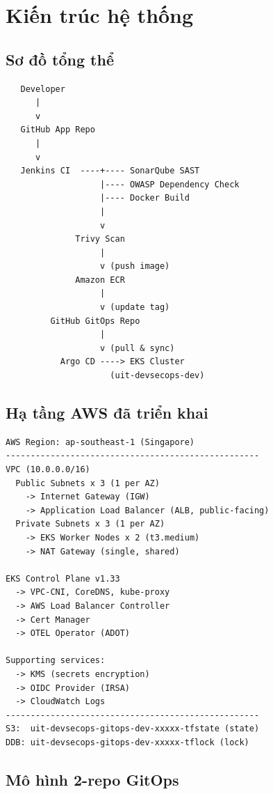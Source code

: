 \documentclass[12pt,a4paper]{article}
\begin{document}
\section{Kiến trúc hệ thống}

\subsection{Sơ đồ tổng thể}

\begin{verbatim}
   Developer
      |
      v
   GitHub App Repo
      |
      v
   Jenkins CI  ----+---- SonarQube SAST
                   |---- OWASP Dependency Check
                   |---- Docker Build
                   |
                   v
              Trivy Scan
                   |
                   v (push image)
              Amazon ECR
                   |
                   v (update tag)
         GitHub GitOps Repo
                   |
                   v (pull & sync)
           Argo CD ----> EKS Cluster
                     (uit-devsecops-dev)
\end{verbatim}

\subsection{Hạ tầng AWS đã triển khai}

\begin{verbatim}
AWS Region: ap-southeast-1 (Singapore)
---------------------------------------------------
VPC (10.0.0.0/16)
  Public Subnets x 3 (1 per AZ)
    -> Internet Gateway (IGW)
    -> Application Load Balancer (ALB, public-facing)
  Private Subnets x 3 (1 per AZ)
    -> EKS Worker Nodes x 2 (t3.medium)
    -> NAT Gateway (single, shared)

EKS Control Plane v1.33
  -> VPC-CNI, CoreDNS, kube-proxy
  -> AWS Load Balancer Controller
  -> Cert Manager
  -> OTEL Operator (ADOT)

Supporting services:
  -> KMS (secrets encryption)
  -> OIDC Provider (IRSA)
  -> CloudWatch Logs
---------------------------------------------------
S3:  uit-devsecops-gitops-dev-xxxxx-tfstate (state)
DDB: uit-devsecops-gitops-dev-xxxxx-tflock (lock)
\end{verbatim}

\subsection{Mô hình 2-repo GitOps}
\end{document}
